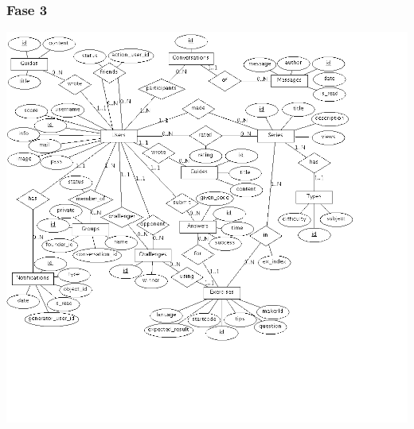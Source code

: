 \subsubsection{Fase 3}
\mbox{\hspace{-16ex}\includegraphics[keepaspectratio=true, scale=0.5]{raport_files/design/ProjectDatabasesER-Fase3.png}}
